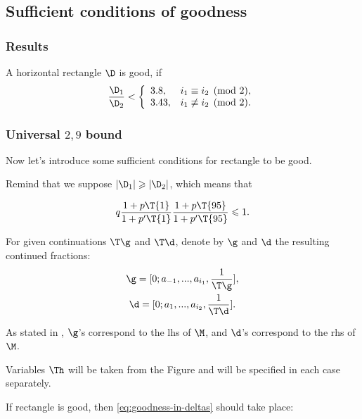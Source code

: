 \subsection{Sufficient conditions of goodness}

\subsubsection{Results}

A horizontal rectangle $\D$ is good, if
\begin{equation}\label{goodness_condition}
	\dfrac{\D_1}{\D_2} <
	\left\{\begin{array}{ll}
		3.8, & i_1 \equiv i_2 \pmod 2,\\
		3.43, & i_1 \not\equiv i_2 \pmod 2.
	\end{array}\right.
\end{equation}

\subsubsection{Universal $2,9$ bound}

Now let's introduce some sufficient conditions for rectangle to be good.

Remind that we suppose $|\D_1| \geqslant |\D_2|$, which means that

\begin{equation*}
	q
	\dfrac{1 + p \T{1}}{1 + p' \T{1}}
	\dfrac{1 + p \T{95}}{1 + p' \T{95}} \leqslant 1.
\end{equation*}

\begin{designation}
	For given continuations $\T\g$ and $\T\d$, denote by $\g$ and $\d$ the resulting continued fractions:
	\begin{gather*}
		\g = [0; a_{-1}, ..., a_{i_1}, \frac{1}{\T\g}], \\
		\d = [0; a_{1}, ..., a_{i_2}, \frac{1}{\T\d}].
	\end{gather*}

	As stated in ,
	$\g$'s correspond to the lhs of $\M$, and $\d$'s correspond to the rhs of $\M$.
	
	Variables $\Th$ will be taken from the Figure 
	and will be specified in each case separately.
\end{designation}

If rectangle is good, then \ref{eq:goodness-in-deltas} should take place:

